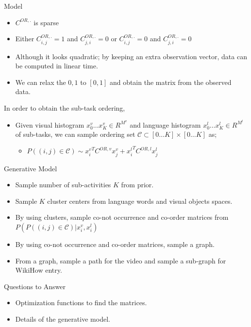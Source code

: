 \begin{frame}{Model}
\begin{itemize}
\item $C^{OR,.}$ is sparse
\item Either $C^{OR,.}_{i,j}=1$ and $C^{OR,.}_{j,i}=0$ or $C^{OR,.}_{i,j}=0$ and $C^{OR,.}_{j,i}=0$
\item Although it looks quadratic; by keeping an extra observation vector, data can be computed in linear time.
\item We can relax the ${0,1}$ to $[0,1]$ and obtain the matrix from the observed data.
\end{itemize}
In order to obtain the sub-task ordering,
\begin{itemize}
\item Given visual histogram $x^v_0 \ldots x^v_K \in R^{M^v}$ and language histogram $x^l_0 \ldots x^l_K \in R^{M^l}$ of sub-tasks, we can sample ordering set $\mathcal{C} \subset [0\ldots K]
 \times [0 \ldots K]$ as;
\begin{itemize}
\item $P((i,j) \in \mathcal{C}) \sim {x^v_i}^T C^{OR,v} x^v_j + {x^l_i}^T C^{OR,l} x^l_j$
\end{itemize} 
\end{itemize}
\end{frame}

\begin{frame}{Generative Model}
\begin{itemize}
\item Sample number of sub-activities $K$ from prior.
\item Sample $K$ cluster centers from language words and visual objects spaces.
\item By using clusters, sample co-not occurrence and co-order matrices from $P(P((i,j) \in \mathcal{C})|x^v_i,x^l_i)$
\item By using co-not occurrence and co-order matrices, sample a graph.
\item From a graph, sample a path for the video and sample a sub-graph for WikiHow entry.
\end{itemize}
\end{frame}	

\begin{frame}{Questions to Answer}
\begin{itemize}
\item Optimization functions to find the matrices.
\item Details of the generative model.
\end{itemize}
\end{frame}	

\fi
